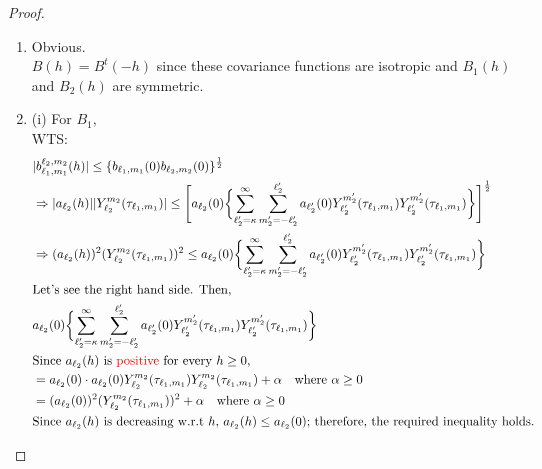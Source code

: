 \documentclass[11pt]{article}
\begin{document}
\begin{itemize}
\begin{proof}
\begin{enumerate}
\item
Obvious.\\
$B(h)=B^t(-h)$ since these covariance functions are isotropic and $B_1(h)$ and $B_2(h)$ are symmetric.\\
\item
(i) For $B_1$,\\
WTS:\\
\begin{align*}
&|b_{\ell_1,m_1}^{\ell_2,m_2}(h)| \le \{b_{\ell_1,m_1}(0) b_{\ell_2,m_2}(0)\}^\frac{1}{2}\\
&\Rightarrow |a_{\ell_2}(h)| |Y_{\ell_2}^{m_2}(\tau_{\ell_1,m_1})| \le \Biggl[ a_{\ell_2}(0) \biggl\{ \sum_{\ell_2'=\kappa}^{\infty} \sum_{m_2'=-\ell_2'}^{\ell_2'} a_{\ell_2'}(0) Y_{\ell_2'}^{m_2'}(\tau_{\ell_1,m_1}) Y_{\ell_2'}^{m_2'}(\tau_{\ell_1,m_1}) \biggl\} \Biggl]^\frac{1}{2}\\
&\Rightarrow (a_{\ell_2}(h))^2 (Y_{\ell_2}^{m_2}(\tau_{\ell_1,m_1}))^2 \le a_{\ell_2}(0) \biggl\{ \sum_{\ell_2'=\kappa}^{\infty} \sum_{m_2'=-\ell_2'}^{\ell_2'} a_{\ell_2'}(0) Y_{\ell_2'}^{m_2'}(\tau_{\ell_1,m_1}) Y_{\ell_2'}^{m_2'}(\tau_{\ell_1,m_1}) \biggl\}\\
&\text{Let's see the right hand side. Then,}\\
&a_{\ell_2}(0) \biggl\{ \sum_{\ell_2'=\kappa}^{\infty} \sum_{m_2'=-\ell_2'}^{\ell_2'} a_{\ell_2'}(0) Y_{\ell_2'}^{m_2'}(\tau_{\ell_1,m_1}) Y_{\ell_2'}^{m_2'}(\tau_{\ell_1,m_1}) \biggl\}\\
&\text{Since $a_{\ell_2}(h)$ is {\color{red} positive} for every $h \ge 0$,}\\
&=a_{\ell_2}(0) \cdot a_{\ell_2}(0) Y_{\ell_2}^{m_2}(\tau_{\ell_1,m_1}) Y_{\ell_2}^{m_2}(\tau_{\ell_1,m_1}) + \alpha \quad \text{where } \alpha \ge 0\\
&= (a_{\ell_2}(0))^2 (Y_{\ell_2}^{m_2}(\tau_{\ell_1,m_1}))^2 +  \alpha \quad \text{where } \alpha \ge 0\\
&\text{Since $a_{\ell_2}(h)$ is decreasing w.r.t $h$,  $a_{\ell_2}(h) \le a_{\ell_2}(0)$; therefore, the required inequality holds.}\\
\end{align*}


\end{enumerate}
\end{proof}
\end{itemize}
\end{document}
